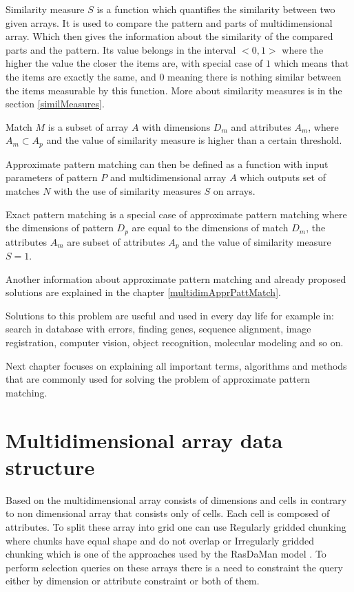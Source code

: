 Similarity measure $S$ is a function which quantifies the similarity between two given arrays. 
It is used to compare the pattern and parts of multidimensional array. Which then gives the information about the similarity of the compared parts and the pattern. Its value belongs in the interval $<0, 1>$ where the higher the value the closer the items are, with special case of $1$ which means that the items are exactly the same, and $0$ meaning there is nothing similar between the items measurable by this function. More about similarity measures is in the section \ref{similMeasures}.

Match $M$ is a subset of array $A$ with dimensions $D_m$ and attributes $A_m$, where $A_m \subset A_p$ and the value of similarity measure is higher than a certain threshold.

Approximate pattern matching can then be defined as a function with input parameters of pattern $P$ and multidimensional array $A$ which outputs set of matches $N$ with the use of similarity measures $S$ on arrays.

Exact pattern matching is a special case of approximate pattern matching where the dimensions of pattern $D_p$ are equal to the dimensions of match $D_m$, the attributes $A_m$ are subset of attributes $A_p$ and the value of similarity measure $S = 1$.

Another information about approximate pattern matching and already proposed solutions are explained in the chapter \ref{multidimApprPattMatch}.

Solutions to this problem are useful and used in every day life for example in: search in database with errors, finding genes, sequence alignment, image registration, computer vision, object recognition, molecular modeling and so on. 

Next chapter focuses on explaining all important terms, algorithms and methods that are commonly used for solving the problem of approximate pattern matching.


\section{Multidimensional array data structure}\label{multidimArrayDataStructure}
Based on \cite{samet} the multidimensional array consists of dimensions and cells in contrary to non dimensional array that consists only of cells. Each cell is composed of attributes. To split these array into grid one can use Regularly gridded chunking where chunks have equal shape and do not overlap or Irregularly gridded chunking which is one of the approaches used by the RasDaMan model \cite{rasdaman}.
To perform selection queries on these arrays there is a need to constraint the query either by dimension or attribute constraint or both of them.

